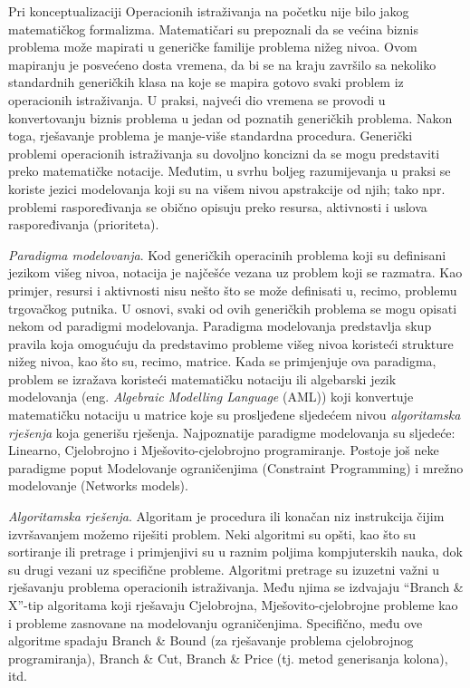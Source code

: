 \documentclass[a4paper, utf8, 11pt, colorlinks]{book}
\begin{document}
Pri konceptualizaciji Operacionih istraživanja na početku nije bilo jakog matematičkog formalizma. Matematičari su prepoznali da se većina biznis problema može  mapirati u generičke familije problema nižeg nivoa. Ovom mapiranju je posvećeno dosta vremena, da bi se na kraju završilo sa nekoliko standardnih generičkih klasa na koje se mapira gotovo svaki problem iz operacionih istraživanja. U praksi, najveći dio vremena se provodi u konvertovanju biznis problema u jedan od poznatih generičkih problema. Nakon toga, rješavanje problema je manje-više standardna procedura. Generički problemi operacionih istraživanja su dovoljno koncizni da se mogu predstaviti preko matematičke notacije. Međutim, u svrhu boljeg razumijevanja u praksi se koriste jezici modelovanja koji su na višem nivou apstrakcije od njih; tako npr. problemi raspoređivanja se obično opisuju preko resursa, aktivnosti i uslova raspoređivanja (prioriteta). 

\emph{Paradigma modelovanja}. Kod generičkih operacinih problema koji su definisani jezikom višeg nivoa, notacija je najčešće vezana uz problem koji se razmatra.
Kao primjer, resursi i aktivnosti nisu nešto što se može definisati u, recimo, problemu trgovačkog putnika. U osnovi, svaki od ovih generičkih problema se mogu opisati nekom od paradigmi modelovanja. Paradigma modelovanja predstavlja skup pravila koja omogućuju da predstavimo probleme višeg nivoa koristeći strukture nižeg nivoa, kao što su, recimo, matrice. Kada se primjenjuje ova paradigma, problem se izražava koristeći matematičku notaciju ili algebarski jezik modelovanja (eng. \emph{Algebraic Modelling Language} (AML)) koji konvertuje matematičku notaciju u matrice koje su prosljeđene sljedećem nivou \emph{algoritamska rješenja} koja generišu rješenja. Najpoznatije paradigme modelovanja su sljedeće: Linearno, Cjelobrojno i Mješovito-cjelobrojno programiranje. Postoje još neke paradigme poput Modelovanje ograničenjima (Constraint Programming) i mrežno modelovanje (Networks models). 

\emph{Algoritamska rješenja}. Algoritam je procedura ili konačan niz instrukcija čijim izvršavanjem možemo riješiti problem. Neki algoritmi su opšti, kao što su sortiranje ili pretrage i primjenjivi su u raznim poljima kompjuterskih nauka, dok su drugi vezani uz specifične probleme. Algoritmi pretrage su izuzetni važni u rješavanju problema operacionih istraživanja. Među njima se izdvajaju ``Branch \& X''-tip algoritama koji rješavaju Cjelobrojna, Mješovito-cjelobrojne probleme kao i probleme zasnovane na modelovanju ograničenjima. Specifično, među ove algoritme spadaju Branch \& Bound (za rješavanje problema cjelobrojnog programiranja), Branch \& Cut, Branch \& Price (tj. metod generisanja kolona), itd.
\end{document}
